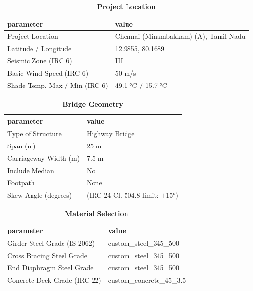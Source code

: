 \documentclass[12pt,a4paper]{report}
\numberwithin{table}{chapter}
\numberwithin{figure}{chapter}
\begin{document}
\begin{table}[H]
\caption{\textbf{Project Location}}
\label{subsec:project-location}
\begin{tabular}{|L{5.5cm}|L{8.5cm}|}
\hline
\textbf{parameter} & \textbf{value} \\
\hline
\textnormal{Project Location} & Chennai (Minambakkam) (A), Tamil Nadu \\
\hline
\textnormal{Latitude / Longitude} & 12.9855, 80.1689 \\
\hline
\textnormal{Seismic Zone (IRC 6)} & III \\
\hline
\textnormal{Basic Wind Speed (IRC 6)} & 50 m/s \\
\hline
\textnormal{Shade Temp. Max / Min (IRC 6)} & 49.1 °C / 15.7 °C \\
\hline
\end{tabular}
\vspace{0.4cm}
\end{table}

\begin{table}[H]
\caption{\textbf{Bridge Geometry}}
\label{subsec:bridge-geometry}
\begin{tabular}{|L{5.5cm}|L{8.5cm}|}
\hline
\textbf{parameter} & \textbf{value} \\
\hline
\textnormal{Type of Structure} & Highway Bridge \\
\hline
\textnormal{Span (m)} & 25 m \\
\hline
\textnormal{Carriageway Width (m)} & 7.5 m \\
\hline
\textnormal{Include Median} & No \\
\hline
\textnormal{Footpath} & None \\
\hline
\textnormal{Skew Angle (degrees)} &  (IRC 24 Cl. 504.8 limit: $\pm$15°) \\
\hline
\end{tabular}
\end{table}
\vspace{0.4cm}

\begin{table}[H]
\caption{\textbf{Material Selection}}
\label{subsec:material}
\begin{tabular}{|L{5.5cm}|L{8.5cm}|}
\hline
\textbf{parameter} & \textbf{value} \\
\hline
\textnormal{Girder Steel Grade (IS 2062)} & custom\_\allowbreak{}steel\_\allowbreak{}345\_\allowbreak{}500 \\
\hline
\textnormal{Cross Bracing Steel Grade} & custom\_\allowbreak{}steel\_\allowbreak{}345\_\allowbreak{}500 \\
\hline
\textnormal{End Diaphragm Steel Grade} & custom\_\allowbreak{}steel\_\allowbreak{}345\_\allowbreak{}500 \\
\hline
\textnormal{Concrete Deck Grade (IRC 22)} & custom\_\allowbreak{}concrete\_\allowbreak{}45\_\allowbreak{}3.5 \\
\hline
\end{tabular}
\end{table}
\vspace{0.4cm}
\end{document}
